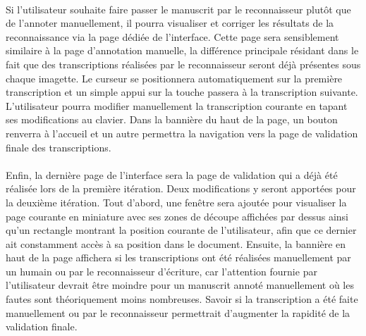 \paragraph{}
Si l’utilisateur souhaite faire passer le manuscrit par le reconnaisseur plutôt que de l’annoter manuellement, il pourra visualiser et corriger les résultats de la reconnaissance via la page dédiée de l’interface. Cette page sera sensiblement similaire à la page d’annotation manuelle, la différence principale résidant dans le fait que des transcriptions réalisées par le reconnaisseur seront déjà présentes sous chaque imagette. Le curseur se positionnera automatiquement sur la première transcription et un simple appui sur la touche  passera à la transcription suivante. L’utilisateur pourra modifier manuellement la transcription courante en tapant ses modifications au clavier.
Dans la bannière du haut de la page, un bouton renverra à l’accueil et un autre permettra la navigation vers la page de validation finale des transcriptions.


\paragraph{}
Enfin, la dernière page de l’interface sera la page de validation qui a déjà été réalisée lors de la première itération. Deux modifications y seront apportées pour la deuxième itération.
Tout d'abord, une fenêtre sera ajoutée pour visualiser la page courante en miniature avec ses zones de découpe affichées par dessus ainsi qu’un rectangle montrant la position courante de l’utilisateur, afin que ce dernier ait constamment accès à sa position dans le document.
Ensuite, la bannière en haut de la page affichera si les transcriptions ont été réalisées manuellement par un humain ou par le reconnaisseur d'écriture, car l'attention fournie par l'utilisateur devrait être moindre pour un manuscrit annoté manuellement où les fautes sont théoriquement moins nombreuses. Savoir si la transcription a été faite manuellement ou par le reconnaisseur permettrait d'augmenter la rapidité de la validation finale.

